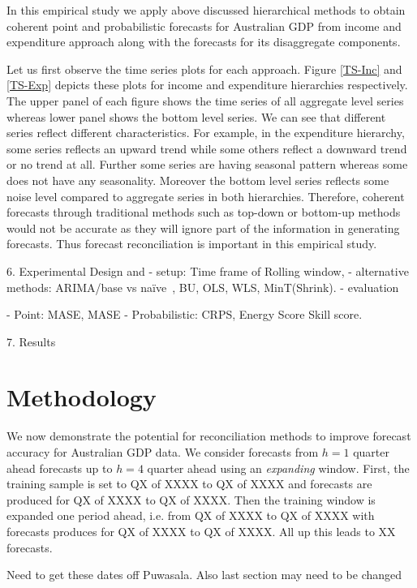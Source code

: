 \documentclass[graybox]{svmult}
\def\naive{na\"{i}ve\ }
\begin{document}
In this empirical study we apply above discussed hierarchical methods to obtain coherent point and probabilistic forecasts for Australian GDP from income and expenditure approach along with the forecasts for its disaggregate components.


Let us first observe the time series plots for each approach. Figure \ref{TS-Inc} and \ref{TS-Exp} depicts these plots for income and expenditure hierarchies respectively. The upper panel of each figure shows the time series of all aggregate level series whereas lower panel shows the bottom level series. We can see that different series reflect different characteristics. For example, in the expenditure hierarchy, some series reflects an upward trend while some others reflect a downward trend or no trend at all. Further some series are having seasonal pattern whereas some does not have any seasonality. Moreover the bottom level series reflects some noise level compared to aggregate series in both hierarchies. Therefore, coherent forecasts through traditional methods such as top-down or bottom-up methods would not be accurate as they will ignore part of the information in generating forecasts. Thus forecast reconciliation is important in this empirical study.


6. Experimental Design and
- setup: Time frame of Rolling window,
- alternative methods: ARIMA/base vs \naive, BU, OLS, WLS, MinT(Shrink).
- evaluation

- Point: MASE, MASE
- Probabilistic: CRPS, Energy Score
Skill score.


7. Results



\clearpage	


\section{Methodology}\label{sec:meth}

We now demonstrate the potential for reconciliation methods to improve forecast accuracy for Australian GDP data.  We consider forecasts from $h=1$ quarter ahead forecasts up to $h=4$ quarter ahead using an {\em expanding} window.  First, the training sample is set to QX of XXXX to QX of XXXX and forecasts are produced for QX of XXXX to QX of XXXX. Then the training window is expanded one period ahead, i.e. from QX of XXXX to QX of XXXX with forecasts produces for QX of XXXX to QX of XXXX.  All up this leads to XX forecasts.

{\color{red} Need to get these dates off Puwasala.  Also last section may need to be changed}
\end{document}
